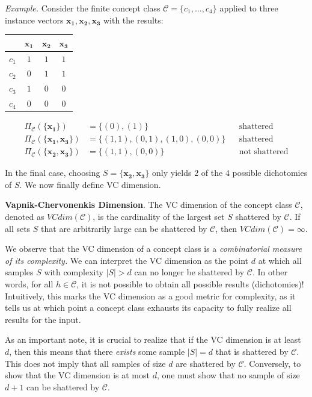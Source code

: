 \documentclass{article}
\begin{document}
\emph{Example.} Consider the finite concept class
$\mathcal{C} = \{c_1, \dots, c_4\}$ applied to three instance vectors
$\mathbf{x_1, x_2, x_3}$ with the results:

\begin{center}
\begin{tabular}{c|c c c}
    &$\mathbf{x_1}$&$\mathbf{x_2}$&$\mathbf{x_3}$\\\hline
    $c_1$&$1$&$1$&$1$\\
    $c_2$&$0$&$1$&$1$\\
    $c_3$&$1$&$0$&$0$\\
    $c_4$&$0$&$0$&$0$
\end{tabular}
\end{center}

\begin{align*}
    \Pi_\mathcal{C}(\{\mathbf{x_1}\}) &= \{(0),(1)\}&&\text{shattered}\\
    \Pi_\mathcal{C}(\{\mathbf{x_1, x_3}\}) &= \{(1,1), (0, 1), (1, 0), (0, 0)\}&&\text{shattered}\\
    \Pi_\mathcal{C}(\{\mathbf{x_2, x_3}\}) &= \{(1,1), (0,0)\}&&\text{not shattered}
\end{align*}

In the final case, choosing $S = \{\mathbf{x_2, x_3}\}$ only yields $2$ of the
$4$ possible dichotomies of $S$. We now finally define VC dimension.\\

\begin{framed}
\textbf{Vapnik-Chervonenkis Dimension}. The VC dimension of the concept class
$\mathcal{C}$, denoted as $VCdim(\mathcal{C})$, is the cardinality of the
largest set $S$ shattered by $\mathcal{C}$. If all sets $S$ that are arbitrarily
large can be shattered by $\mathcal{C}$, then $VCdim(\mathcal{C}) = \infty$.
\end{framed}

We observe that the VC dimension of a concept class is a
\emph{combinatorial measure of its complexity.} We can interpret the VC
dimension as the point $d$ at which all samples $S$ with complexity $|S| > d$
can no longer be shattered by $\mathcal{C}$. In other words, for all
$h \in \mathcal{C}$, it is not possible to obtain all possible results
(dichotomies)! Intuitively, this marks the VC dimension as a good metric for
complexity, as it tells us at which point a concept class
exhausts its capacity to fully realize all results for the input.

As an important note, it is crucial to realize that if the VC dimension is at
least $d$, then this means that there \emph{exists} some sample $|S| = d$ that
is shattered by $\mathcal{C}$. This does not imply that all samples of size $d$
are shattered by $\mathcal{C}$. Conversely, to show that the VC dimension is at
most $d$, one must show that no sample of size $d+1$ can be shattered by
$\mathcal{C}$.
\end{document}
